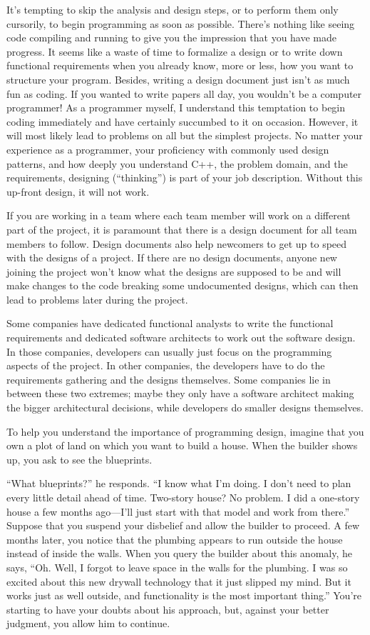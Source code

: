 It’s tempting to skip the analysis and design steps, or to perform them only cursorily, to begin programming as soon as possible. There’s nothing like seeing code compiling and running to give you the impression that you have made progress. It seems like a waste of time to formalize a design or to write down functional requirements when you already know, more or less, how you want to structure your program. Besides, writing a design document just isn’t as much fun as coding. If you wanted to write papers all day, you wouldn’t be a computer programmer! As a programmer myself, I understand this temptation to begin coding immediately and have certainly succumbed to it on occasion. However, it will most likely lead to problems on all but the simplest projects. No matter your experience as a programmer, your proficiency with commonly used design patterns, and how deeply you understand C++, the problem domain, and the requirements, designing (“thinking”) is part of your job description. Without this up-front design, it will not work.

If you are working in a team where each team member will work on a different part of the project, it is paramount that there is a design document for all team members to follow. Design documents also help newcomers to get up to speed with the designs of a project. If there are no design documents, anyone new joining the project won’t know what the designs are supposed to be and will make changes to the code breaking some undocumented designs, which can then lead to problems later during the project.

Some companies have dedicated functional analysts to write the functional requirements and dedicated software architects to work out the software design. In those companies, developers can usually just focus on the programming aspects of the project. In other companies, the developers have to do the requirements gathering and the designs themselves. Some companies lie in between these two extremes; maybe they only have a software architect making the bigger architectural decisions, while developers do smaller designs themselves.

To help you understand the importance of programming design, imagine that you own a plot of land on which you want to build a house. When the builder shows up, you ask to see the blueprints.

“What blueprints?” he responds. “I know what I’m doing. I don’t need to plan every little detail ahead of time. Two-story house? No problem. I did a one-story house a few months ago—I’ll just start with that model and work from there.” Suppose that you suspend your disbelief and allow the builder to proceed. A few months later, you notice that the plumbing appears to run outside the house instead of inside the walls. When you query the builder about this anomaly, he says, “Oh. Well, I forgot to leave space in the walls for the plumbing. I was so excited about this new drywall technology that it just slipped my mind. But it works just as well outside, and functionality is the most important thing.” You’re starting to have your doubts about his approach, but, against your better judgment, you allow him to continue.

